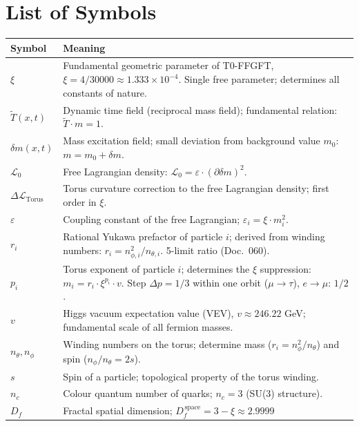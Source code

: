 \section*{List of Symbols}

\begin{longtable}{lp{9.5cm}}
\toprule
\textbf{Symbol} & \textbf{Meaning} \\
\midrule
\endhead
$\xi$ & Fundamental geometric parameter of T0-FFGFT,
        $\xi = 4/30000 \approx 1.333 \times 10^{-4}$.
        Single free parameter; determines all constants of nature. \\[4pt]
$\tilde{T}(x,t)$ & Dynamic time field (reciprocal mass field);
        fundamental relation: $\tilde{T} \cdot m = 1$. \\[4pt]
$\delta m(x,t)$ & Mass excitation field; small deviation from
        background value $m_0$: $m = m_0 + \delta m$. \\[4pt]
$\mathcal{L}_0$ & Free Lagrangian density:
        $\mathcal{L}_0 = \varepsilon \cdot (\partial\delta m)^2$. \\[4pt]
$\Delta\mathcal{L}_{\mathrm{Torus}}$ & Torus curvature correction
        to the free Lagrangian density; first order in $\xi$. \\[4pt]
$\varepsilon$ & Coupling constant of the free Lagrangian;
        $\varepsilon_i = \xi \cdot m_i^2$. \\[4pt]
$r_i$ & Rational Yukawa prefactor of particle $i$;
        derived from winding numbers: $r_i = n_{\phi,i}^2/n_{\theta,i}$.
        5-limit ratio (Doc.~060). \\[4pt]
$p_i$ & Torus exponent of particle $i$; determines the
        $\xi$ suppression: $m_i = r_i \cdot \xi^{p_i} \cdot v$.
        Step $\Delta p = 1/3$ within one orbit ($\mu\to\tau$),
        $e\to\mu$: $1/2$. \\[4pt]
$v$ & Higgs vacuum expectation value (VEV),
        $v \approx 246.22$ GeV; fundamental scale of all fermion masses. \\[4pt]
$n_\theta, n_\phi$ & Winding numbers on the torus;
        determine mass ($r_i = n_\phi^2/n_\theta$) and
        spin ($n_\phi/n_\theta = 2s$). \\[4pt]
$s$ & Spin of a particle; topological property of
        the torus winding. \\[4pt]
$n_c$ & Colour quantum number of quarks; $n_c = 3$ (SU(3) structure). \\[4pt]
$D_f$ & Fractal spatial dimension;
        $D_f^{\,\text{space}} = 3 - \xi \approx 2.9999$

\end{longtable}

